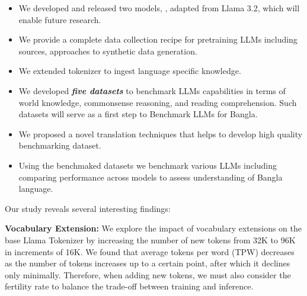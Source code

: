 \begin{itemize}[noitemsep,topsep=0pt,labelsep=.5em] %
\item We developed and released two models, \titu{}, adapted from Llama 3.2, which will enable future research. 
\item We provide a complete data collection recipe for pretraining LLMs including sources, approaches to synthetic data generation. 
\item We extended tokenizer to ingest language specific knowledge. 
\item We developed \textit{\textbf{five datasets}} to benchmark LLMs capabilities in terms of world knowledge, commonsense reasoning, and reading comprehension. Such datasets will serve as a first step to Benchmark LLMs for Bangla.
\item We proposed a novel translation techniques that helps to develop high quality benchmarking dataset. 
\item Using the benchmaked datasets we benchmark various LLMs including \titu{} comparing performance across models to assess understanding of Bangla language. 
\end{itemize}

\noindent
Our study reveals several interesting findings:

\noindent
\textbf{Vocabulary Extension:} We explore the impact of vocabulary extensions on the base Llama Tokenizer by increasing the number of new tokens from 32K to 96K in increments of 16K. We found that average tokens per word (TPW) decreases as the number of tokens increases up to a certain point, after which it declines only minimally. Therefore, when adding new tokens, we must also consider the fertility rate to balance the trade-off between training and inference.

